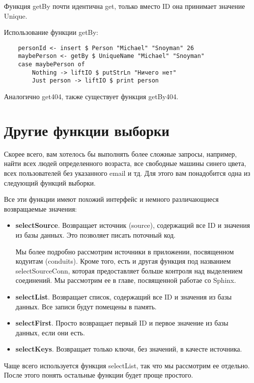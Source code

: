 Функция getBy почти идентична get, только вместо ID она принимает значение Unique.

Использование функции getBy:

\begin{lstlisting}
    personId <- insert $ Person "Michael" "Snoyman" 26
    maybePerson <- getBy $ UniqueName "Michael" "Snoyman"
    case maybePerson of
        Nothing -> liftIO $ putStrLn "Ничего нет"
        Just person -> liftIO $ print person
\end{lstlisting}

Аналогично get404, также существует функция getBy404.

\section{Другие функции выборки} %

Скорее всего, вам хотелось бы выполнять более сложные запросы, например, найти всех людей определенного возраста, все свободные машины синего цвета, всех пользователей без указанного email и тд. Для этого вам понадобится одна из следующий функций выборки.

Все эти функции имеют похожий интерфейс и немного различающиеся возвращаемые значения: 

\begin{itemize}
\item {\bf selectSource}. Возвращает источник (source), содержащий все ID и значения из базы данных. Это позволяет писать поточный код.
\begin{remark}
Мы более подробно рассмотрим источники в приложении, посвященном кодуитам (conduits). Кроме того, есть и другая функция под названием selectSourceConn, которая предоставляет больше контроля над выделением соединений. Мы рассмотрим ее в главе, посвященной работае со Sphinx.
\end{remark}
\item {\bf selectList}. Возвращает список, содержащий все ID и значения из базы данных. Все записи будут помещены в память.
\item {\bf selectFirst}. Просто возвращает первый ID и первое значение из базы данных, если они есть.
\item {\bf selectKeys}. Возвращает только ключи, без значений, в качесте источника.
\end{itemize}

Чаще всего используется функция selectList, так что мы рассмотрим ее отдельно. После этого понять остальные функции будет проще простого.

